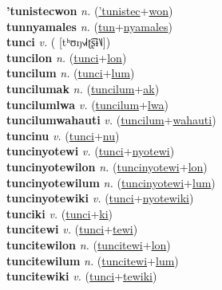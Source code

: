 \textbf{'tunistecwon} \textit{n.} (\hyperref['tunistec]{'tunistec}+\hyperref[won]{won})
 \label{'tunistecwon} \\
\textbf{tunnyamales} \textit{n.} (\hyperref[tun]{tun}+\hyperref[nyamales]{nyamales})
 \label{tunnyamales} \\
\textbf{tunci} \textit{v.} ( [tʰʊŋ˧˩˧ʈ͡ʂɨ˥˩])
 \label{tunci} \\
\textbf{tuncilon} \textit{n.} (\hyperref[tunci]{tunci}+\hyperref[lon]{lon})
 \label{tuncilon} \\
\textbf{tuncilum} \textit{n.} (\hyperref[tunci]{tunci}+\hyperref[lum]{lum})
 \label{tuncilum} \\
\textbf{tuncilumak} \textit{n.} (\hyperref[tuncilum]{tuncilum}+\hyperref[ak]{ak})
 \label{tuncilumak} \\
\textbf{tuncilumlwa} \textit{v.} (\hyperref[tuncilum]{tuncilum}+\hyperref[lwa]{lwa})
 \label{tuncilumlwa} \\
\textbf{tuncilumwahauti} \textit{v.} (\hyperref[tuncilum]{tuncilum}+\hyperref[wahauti]{wahauti})
 \label{tuncilumwahauti} \\
\textbf{tuncinu} \textit{v.} (\hyperref[tunci]{tunci}+\hyperref[nu]{nu})
 \label{tuncinu} \\
\textbf{tuncinyotewi} \textit{v.} (\hyperref[tunci]{tunci}+\hyperref[nyotewi]{nyotewi})
 \label{tuncinyotewi} \\
\textbf{tuncinyotewilon} \textit{n.} (\hyperref[tuncinyotewi]{tuncinyotewi}+\hyperref[lon]{lon})
 \label{tuncinyotewilon} \\
\textbf{tuncinyotewilum} \textit{n.} (\hyperref[tuncinyotewi]{tuncinyotewi}+\hyperref[lum]{lum})
 \label{tuncinyotewilum} \\
\textbf{tuncinyotewiki} \textit{v.} (\hyperref[tunci]{tunci}+\hyperref[nyotewiki]{nyotewiki})
 \label{tuncinyotewiki} \\
\textbf{tunciki} \textit{v.} (\hyperref[tunci]{tunci}+\hyperref[ki]{ki})
 \label{tunciki} \\
\textbf{tuncitewi} \textit{v.} (\hyperref[tunci]{tunci}+\hyperref[tewi]{tewi})
 \label{tuncitewi} \\
\textbf{tuncitewilon} \textit{n.} (\hyperref[tuncitewi]{tuncitewi}+\hyperref[lon]{lon})
 \label{tuncitewilon} \\
\textbf{tuncitewilum} \textit{n.} (\hyperref[tuncitewi]{tuncitewi}+\hyperref[lum]{lum})
 \label{tuncitewilum} \\
\textbf{tuncitewiki} \textit{v.} (\hyperref[tunci]{tunci}+\hyperref[tewiki]{tewiki})
 \label{tuncitewiki} \\

